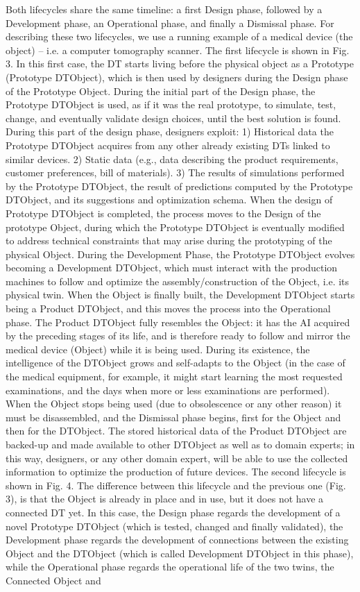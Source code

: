 Both lifecycles share the same timeline: a first Design phase, followed by a Development phase, an Operational phase, and finally a Dismissal phase. For describing these two lifecycles, we use a running example of a medical device (the object) – i.e. a computer tomography scanner. The first lifecycle is shown in Fig. 3. In this first case, the DT starts living before the physical object as a Prototype (Prototype DTObject), which is then used by designers during the Design phase of the Prototype Object. During the initial part of the Design phase, the Prototype DTObject is used, as if it was the real prototype, to simulate, test, change, and eventually validate design choices, until the best solution is found. During this part of the design phase, designers exploit: 1) Historical data the Prototype DTObject acquires from any other already existing DTs linked to similar devices. 2) Static data (e.g., data describing the product requirements, customer preferences, bill of materials). 3) The results of simulations performed by the Prototype DTObject, the result of predictions computed by the Prototype DTObject, and its suggestions and optimization schema. When the design of Prototype DTObject is completed, the process moves to the Design of the prototype Object, during which the Prototype DTObject is eventually modified to address technical constraints that may arise during the prototyping of the physical Object. During the Development Phase, the Prototype DTObject evolves becoming a Development DTObject, which must interact with the production machines to follow and optimize the assembly/construction of the Object, i.e. its physical twin. When the Object is finally built, the Development DTObject starts being a Product DTObject, and this moves the process into the Operational phase. The Product DTObject fully resembles the Object: it has the AI acquired by the preceding stages of its life, and is therefore ready to follow and mirror the medical device (Object) while it is being used. During its existence, the intelligence of the DTObject grows and self-adapts to the Object (in the case of the medical equipment, for example, it might start learning the most requested examinations, and the days when more or less examinations are performed). When the Object stops being used (due to obsolescence or any other reason) it must be disassembled, and the Dismissal phase begins, first for the Object and then for the DTObject. The stored historical data of the Product DTObject are backed-up and made available to other DTObject as well as to domain experts; in this way, designers, or any other domain expert, will be able to use the collected information to optimize the production of future devices. The second lifecycle is shown in Fig. 4. The difference between this lifecycle and the previous one (Fig. 3), is that the Object is already in place and in use, but it does not have a connected DT yet. In this case, the Design phase regards the development of a novel Prototype DTObject (which is tested, changed and finally validated), the Development phase regards the development of connections between the existing Object and the DTObject (which is called Development DTObject in this phase), while the Operational phase regards the operational life of the two twins, the Connected Object and 